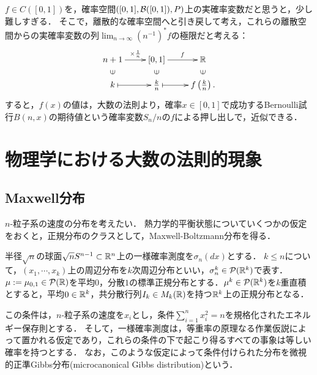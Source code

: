 \documentclass[uplatex,dvipdfmx]{jsreport}
\begin{document}
\begin{remarks}
    $f\in C([0,1])$を，確率空間$([0,1],\mathcal{B}([0,1]),P)$上の実確率変数だと思うと，少し難しすぎる．
    そこで，離散的な確率空間へと引き戻して考え，これらの離散空間からの実確率変数の列$\lim_{n\to\infty}(n^{-1})^*f$の極限だと考える：
    \[\xymatrix@R-2pc{
        n+1\ar[r]^-{\times\frac{1}{n}}&[0,1]\ar[r]^-{f}&\R\\
        \rotatebox[origin=c]{90}{$\in$}&\rotatebox[origin=c]{90}{$\in$}&\rotatebox[origin=c]{90}{$\in$}\\
        k\ar@{|->}[r]&\frac{k}{n}\ar@{|->}[r]&f\paren{\frac{k}{n}}.
    }\]
    すると，$f(x)$の値は，大数の法則より，確率$x\in[0,1]$で成功するBernoulli試行$B(n,x)$の期待値という確率変数$S_n/n$の$f$による押し出しで，近似できる．
\end{remarks}

\section{物理学における大数の法則的現象}

\subsection{Maxwell分布}

\begin{tcolorbox}[colframe=ForestGreen, colback=ForestGreen!10!white,breakable,colbacktitle=ForestGreen!40!white,coltitle=black,fonttitle=\bfseries\sffamily,
title=]
    $n$-粒子系の速度の分布を考えたい．
    熱力学的平衡状態についていくつかの仮定をおくと，正規分布のクラスとして，Maxwell-Boltzmann分布を得る．
\end{tcolorbox}

\begin{notation}
    半径$\sqrt{n}$の球面$\sqrt{n}S^{n-1}\subset\mathbb{R}^n$上の一様確率測度を$\sigma_n(dx)$とする．
    $k\le n$について，$(x_1,\cdots,x_k)$上の周辺分布を$k$次周辺分布といい，$\sigma^k_n\in\mathcal{P}(\mathbb{R}^k)$で表す．
    $\mu:=\mu_{0,1}\in\mathcal{P}(\mathbb{R})$を平均$0$，分散$1$の標準正規分布とする．$\mu^k\in\mathcal{P}(\mathbb{R}^k)$を$k$重直積とすると，平均$0\in\mathbb{R}^k$，共分散行列$I_k\in M_k(\mathbb{R})$を持つ$\mathbb{R}^k$上の正規分布となる．
\end{notation}
\begin{remarks}
    この条件は，$n$-粒子系の速度を$x_i$とし，条件$\sum_{i=1}^nx_i^2=n$を規格化されたエネルギー保存則とする．
    そして，一様確率測度は，等重率の原理なる作業仮説によって置かれる仮定であり，これらの条件の下で起こり得るすべての事象は等しい確率を持つとする．
    なお，このような仮定によって条件付けられた分布を微視的正準Gibbs分布(microcanonical Gibbs distribution)という．
\end{remarks}
\end{document}
